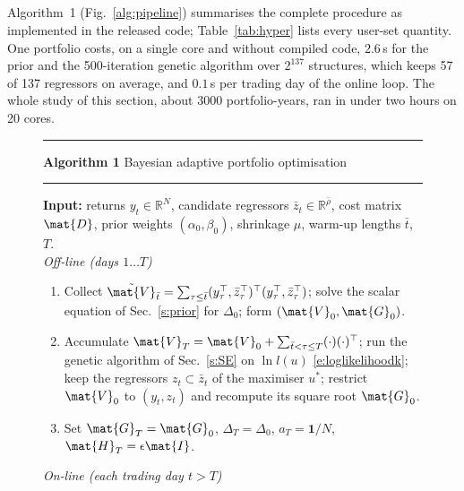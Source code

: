 \subsection{} \label{s:algorithm}\label{s:runtime}
Algorithm~1 (Fig.~\ref{alg:pipeline}) summarises the complete procedure as implemented in the released code; Table~\ref{tab:hyper} lists every user-set quantity. One portfolio costs, on a single core and without compiled code, $2.6$\,s for the prior and the 500-iteration genetic algorithm over $2^{137}$ structures, which keeps 57 of 137 regressors on average, and $0.1$\,s per trading day of the online loop. The whole study of this section, about 3000 portfolio-years, ran in under two hours on 20 cores.

\begin{figure}[ht!]
\begin{minipage}{\columnwidth}
\noindent\rule{\linewidth}{0.6pt}\par\vspace{2pt}
\noindent\textbf{Algorithm 1} Bayesian adaptive portfolio optimisation\par
\noindent\rule{\linewidth}{0.4pt}\par\vspace{2pt}
\noindent\textbf{Input:} returns $y_t\in\mathbb{R}^N$, candidate regressors $\bar{z}_t\in\mathbb{R}^{\bar\rho}$, cost matrix $\mat{D}$, prior weights $(\alpha_0,\beta_0)$, shrinkage $\mu$, warm-up lengths $\bar{t}$, $T$.\\[2pt]
\noindent\emph{Off-line (days $1\ldots T$)}
\begin{enumerate}\setlength{\itemsep}{0pt}
\item Collect $\tilde{\mat{V}}_{\bar t}=\sum_{\tau\le\bar t}(y_\tau^\top,\bar z_\tau^\top)^\top(y_\tau^\top,\bar z_\tau^\top)$; solve the scalar equation of Sec.~\ref{s:prior} for $\Delta_0$; form $(\mat{V}_0,\mat{G}_0)$.
\item Accumulate $\mat{V}_T=\mat{V}_0+\sum_{\bar t<\tau\le T}(\cdot)(\cdot)^\top$; run the genetic algorithm of Sec.~\ref{s:SE} on $\ln l(u)$ \eqref{e:loglikelihoodk}; keep the regressors $z_t\subset\bar z_t$ of the maximiser $u^*$; restrict $\mat{V}_0$ to $(y_t,z_t)$ and recompute its square root $\mat{G}_0$.
\item Set $\mat{G}_T=\mat{G}_0$, $\Delta_T=\Delta_0$, $a_T=\mathbf{1}/N$, $\mat{H}_T=\epsilon\mat{I}$.
\end{enumerate}
\noindent\emph{On-line (each trading day $t>T$)}
\begin{enumerate}\setlength{\itemsep}{0pt}\setcounter{enumi}{3}

\end{enumerate}
\end{minipage}
\end{figure}
